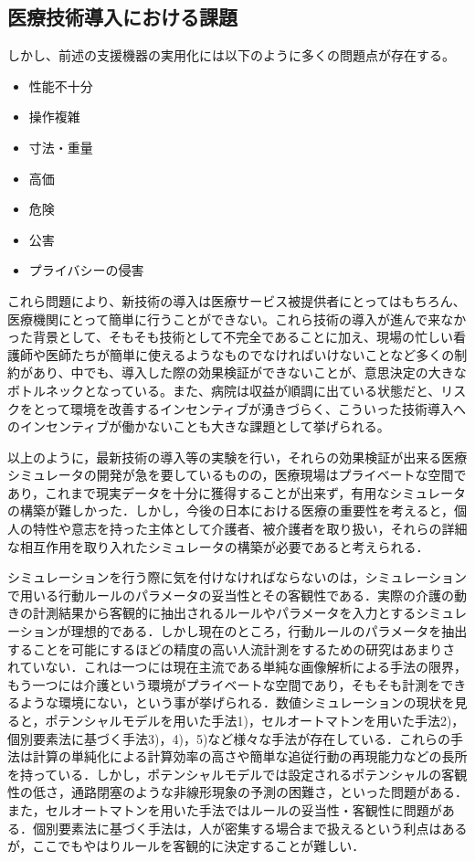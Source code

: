 \subsection{医療技術導入における課題}

しかし、前述の支援機器の実用化には以下のように多くの問題点が存在する。

\begin{itemize}
 \item 性能不十分
 \item 操作複雑
 \item 寸法・重量
 \item 高価
 \item 危険
 \item 公害
 \item プライバシーの侵害
\end{itemize}

これら問題により、新技術の導入は医療サービス被提供者にとってはもちろん、医療機関にとって簡単に行うことができない。これら技術の導入が進んで来なかった背景として、そもそも技術として不完全であることに加え、現場の忙しい看護師や医師たちが簡単に使えるようなものでなければいけないことなど多くの制約があり、中でも、導入した際の効果検証ができないことが、意思決定の大きなボトルネックとなっている。また、病院は収益が順調に出ている状態だと、リスクをとって環境を改善するインセンティブが湧きづらく、こういった技術導入へのインセンティブが働かないことも大きな課題として挙げられる。

以上のように，最新技術の導入等の実験を行い，それらの効果検証が出来る医療シミュレータの開発が急を要しているものの，医療現場はプライベートな空間であり，これまで現実データを十分に獲得することが出来ず，有用なシミュレータの構築が難しかった．しかし，今後の日本における医療の重要性を考えると，個人の特性や意志を持った主体として介護者、被介護者を取り扱い，それらの詳細な相互作用を取り入れたシミュレータの構築が必要であると考えられる．

シミュレーションを行う際に気を付けなければならないのは，シミュレーションで用いる行動ルールのパラメータの妥当性とその客観性である．実際の介護の動きの計測結果から客観的に抽出されるルールやパラメータを入力とするシミュレーションが理想的である．しかし現在のところ，行動ルールのパラメータを抽出することを可能にするほどの精度の高い人流計測をするための研究はあまりされていない．これは一つには現在主流である単純な画像解析による手法の限界，もう一つには介護という環境がプライベートな空間であり，そもそも計測をできるような環境にない，という事が挙げられる．数値シミュレーションの現状を見ると，ポテンシャルモデルを用いた手法1)，セルオートマトンを用いた手法2)，個別要素法に基づく手法3)，4)，5)など様々な手法が存在している．これらの手法は計算の単純化による計算効率の高さや簡単な追従行動の再現能力などの長所を持っている．しかし，ポテンシャルモデルでは設定されるポテンシャルの客観性の低さ，通路閉塞のような非線形現象の予測の困難さ，といった問題がある．また，セルオートマトンを用いた手法ではルールの妥当性・客観性に問題がある．個別要素法に基づく手法は，人が密集する場合まで扱えるという利点はあるが，ここでもやはりルールを客観的に決定することが難しい．

